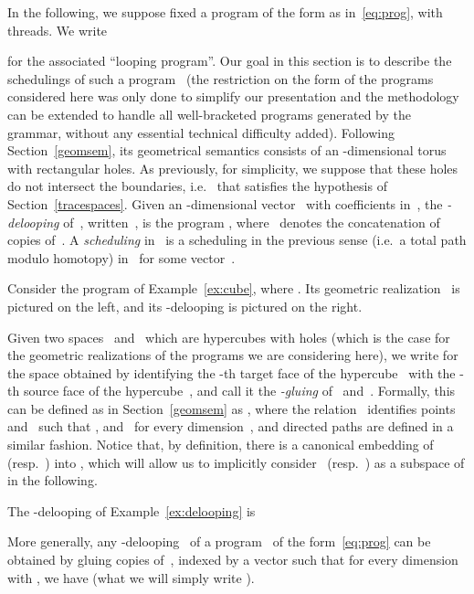 \documentclass[orivec]{llncs} \usepackage[T1]{fontenc}
\newcommand{\nbd}{\nobreakdash-\hspace{0pt}}
\newcommand{\ie}{i.e.~}
\newcommand{\resp}{resp.~}
\begin{document}
In the following, we suppose fixed a program of the form
 as in~\eqref{eq:prog}, with  threads. We write

for the associated ``looping program''. Our goal in this section is to describe
the schedulings of such a program~ (the restriction on the form of the
programs considered here was only done to simplify our presentation and the
methodology can be extended to handle all well-bracketed programs generated by
the grammar, without any essential technical difficulty added). Following
Section~\ref{geomsem}, its geometrical semantics consists of an
\nbd{}dimensional torus with rectangular holes. As previously, for
simplicity, we suppose that these holes do not intersect the boundaries, \ie
that  satisfies the hypothesis of Section~\ref{tracespaces}. Given an
-dimensional vector~ with coefficients in~, the
\emph{-delooping} of~, written~, is the program
, where~ denotes the
concatenation of~ copies of~. A \emph{scheduling} in~ is a
scheduling in the previous sense (\ie a total path modulo homotopy) in~ for
some vector~.

\begin{example}
  \label{ex:delooping}
  Consider the program  of Example~\ref{ex:cube}, where . Its geometric realization~ is pictured on the left, and its
  \nbd{}delooping  is pictured on the right.
  \vspace{-4ex}
  
\end{example}

Given two spaces~ and~ which are hypercubes with holes (which is the case
for the geometric realizations of the programs we are considering here), we
write  for the space obtained by identifying the -th target face
of the hypercube~ with the \nbd{}th source face of the hypercube~, and
call it the \emph{\nbd{}gluing} of~ and~. Formally, this can be defined
as in Section~\ref{geomsem} as , where the
relation~ identifies points~ and~ such that ,
 and~ for every dimension~, and directed paths
are defined in a similar fashion. Notice that, by definition, there is a
canonical embedding of  (\resp ) into , which will allow us to
implicitly consider~ (\resp ) as a subspace of  in the
following.

\begin{example}
  \label{ex:glue322}
  The -delooping of Example~\ref{ex:delooping} is
  
\end{example}

\noindent
More generally, any \nbd{}delooping~ of a program~ of the
form~\eqref{eq:prog} can be obtained by gluing copies  of~, indexed
by a vector  such that for every dimension~ with , we have
 (what we will simply write ).
\end{document}
